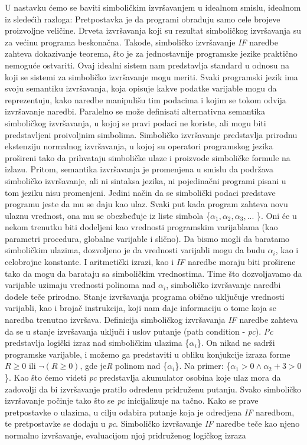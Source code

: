 \documentclass[a4paper]{article}
\begin{document}
{U nastavku ćemo se baviti simboličkim izvršavanjem u idealnom smislu, idealnom iz sledećih razloga:
Pretpostavka je da programi obrađuju samo cele brojeve proizvoljne veličine. Drveta izvršavanja koji su rezultat simboličkog izvršavanja su za većinu programa beskonačna. Takođe, simboličko izvršavanje \textit{IF} naredbe zahteva dokazivanje teorema, što je za jednostavnije programske jezike praktično nemoguće ostvariti. Ovaj idealni sistem nam predstavlja standard u odnosu na koji se sistemi za simboličko izvršavanje mogu meriti. Svaki programski jezik ima svoju semantiku izvršavanja, koja opisuje kakve podatke varijable mogu da reprezentuju, kako naredbe manipulišu tim podacima i kojim se tokom odvija  izvršavanje naredbi. Paralelno se može definisati alternativna semantika simboličkog izvršavanja, u kojoj se pravi podaci ne koriste, ali mogu biti predstavljeni proivoljnim simbolima. Simboličko izvršavanje predstavlja prirodnu ekstenziju normalnog izvršavanja, u kojoj su operatori programskog jezika prošireni tako da prihvataju simboličke ulaze i proizvode simboličke formule na izlazu. Pritom, semantika izvršavanja je promenjena u smislu da podržava simboličko izvršavanje, ali ni sintaksa jezika, ni pojedinačni programi pisani u tom jeziku nisu promenjeni. Jedini način da se simbolički podaci predstave programu jeste da mu se daju kao ulaz. Svaki put kada program zahteva novu ulaznu vrednost, ona mu se obezbeđuje iz liste simbola \{$\alpha_1, \alpha_2, \alpha_3, ... $ \}. Oni će u nekom trenutku biti dodeljeni kao vrednosti programskim varijablama (kao parametri procedura, globalne varijable i slično). Da bismo mogli da baratamo simboličkim ulazima, dozvoljeno je da vrednosti varijabli mogu da budu $\alpha_i$, kao i celobrojne konstante. I aritmetički izrazi, kao i \textit{IF} naredbe moraju biti proširene tako da mogu da barataju sa simboličkim vrednostima. Time što dozvoljavamo da varijable uzimaju vrednosti polinoma nad $\alpha_i$, simboličko izvršavanje naredbi dodele teče prirodno.
Stanje izvršavanja programa obično uključuje vrednosti varijabli, kao i brojač instrukcija, koji nam daje informaciju o tome koja se naredba trenutno izvršava. Definicija simboličkog izvršavanja \textit{IF} naredbe zahteva da se u stanje izvršavanja uključi i uslov putanje (path condition - \textit{pc}). \textit{Pc} predstavlja logički izraz nad simboličkim ulazima \{$\alpha_i$\}. On nikad ne sadrži programske varijable, i možemo ga predstaviti u obliku konjukcije izraza forme $R \ge 0$ ili  $\neg(R \ge 0)$, gde je\textit{R} polinom nad \{$\alpha_i$\}. Na primer:  \{$\alpha_1 > 0 \wedge  \alpha_2 + 3 > 0 $\}. Kao što ćemo videti \textit{pc} predstavlja akumulator osobina koje ulaz mora da zadovolji da bi izvršavanje pratilo određenu pridruženu putanju. Svako simboličko izvršavanje počinje tako što se \textit{pc} inicijalizuje na tačno. Kako se prave pretpostavke o ulazima, u cilju odabira putanje koja je odredjena \textit{IF} naredbom, te pretpostavke se dodaju u \textit{pc}. Simboličko izvršavanje \textit{IF} naredbe teče kao njeno normalno izvršavanje, evaluacijom njoj pridruženog logičkog izraza 
}
\end{document}

